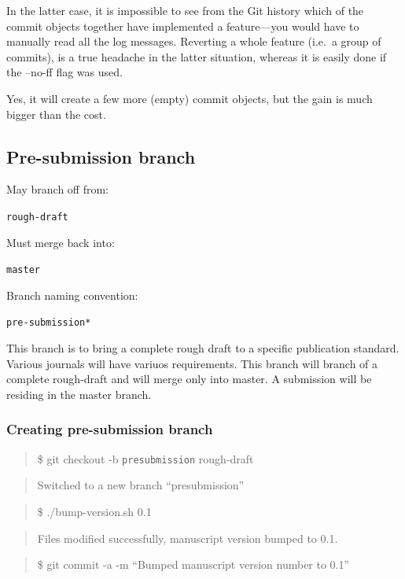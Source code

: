 \documentclass[]{book}
\begin{document}
In the latter case, it is impossible to see from the Git history which
of the commit objects together have implemented a feature---you would
have to manually read all the log messages. Reverting a whole feature
(i.e.~a group of commits), is a true headache in the latter situation,
whereas it is easily done if the --no-ff flag was used.

Yes, it will create a few more (empty) commit objects, but the gain is
much bigger than the cost.

\subsection{Pre-submission branch}\label{pre-submission-branch}

May branch off from:

\texttt{rough-draft}

Must merge back into:

\texttt{master}

Branch naming convention:

\texttt{pre-submission*}

This branch is to bring a complete rough draft to a specific publication
standard. Various journals will have variuos requirements. This branch
will branch of a complete rough-draft and will merge only into master. A
submission will be residing in the master branch.

\subsubsection{Creating pre-submission
branch}\label{creating-pre-submission-branch}

\begin{quote}
\$ git checkout -b \texttt{presubmission} rough-draft
\end{quote}

\begin{quote}
Switched to a new branch ``presubmission''
\end{quote}

\begin{quote}
\$ ./bump-version.sh 0.1
\end{quote}

\begin{quote}
Files modified successfully, manuscript version bumped to 0.1.
\end{quote}

\begin{quote}
\$ git commit -a -m ``Bumped manuscript version number to 0.1''
\end{quote}
\end{document}
